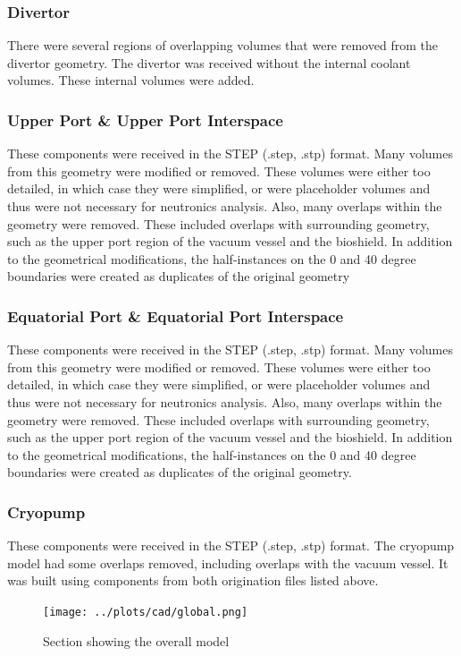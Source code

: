 \documentclass[12pt]{article}
\begin{document}
\subsubsection*{Divertor}
There were several regions of overlapping volumes that were removed from the 
divertor geometry. The divertor was received without the internal coolant 
volumes. These internal volumes were added.
\subsubsection*{Upper Port \& Upper Port Interspace}
These components were received in the STEP (.step, .stp) format. Many volumes 
from this geometry were modified or removed. These volumes were either too
detailed, in which case they were simplified, or were placeholder volumes and 
thus were not necessary for neutronics analysis. Also, many overlaps within the 
geometry were removed. These included overlaps with surrounding geometry, such 
as the upper port region of the vacuum vessel and the bioshield. In addition to 
the geometrical modifications, the half-instances on the 0 and 40 degree 
boundaries were created as duplicates of the original geometry
\subsubsection*{Equatorial Port \& Equatorial Port Interspace}
These components were received in the STEP (.step, .stp) format. Many volumes 
from this geometry were modified or removed. These volumes were either too 
detailed, in which case they were simplified, or were placeholder volumes 
and thus were not necessary for neutronics analysis. Also, many overlaps
within the geometry were removed. These included overlaps with surrounding 
geometry, such as the upper port region of the vacuum vessel and the bioshield. 
In addition to the geometrical modifications, the half-instances on the 0 and 40
degree boundaries were created as duplicates of the original geometry.
\subsubsection*{Cryopump}
These components were received in the STEP (.step, .stp) format. The
cryopump model had some overlaps removed, including overlaps with the vacuum 
vessel. It was built using components from both origination files listed above.

\begin{figure}[ht!]
  \centering
  \texttt{[image: ../plots/cad/global.png]}
  \caption{Section showing the overall model}
  \label{fig:cad_iter_global}
\end{figure}
\end{document}
